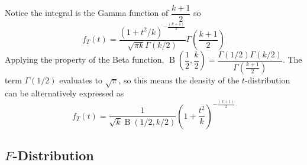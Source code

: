 \documentclass[11pt]{report} %
\begin{document}
Notice the integral is the Gamma function of $\dfrac{k+1}{2}$ so
\begin{equation}
f_{T}\left(t\right)=\dfrac{\left(1+t^{2}/k\right)^{-\frac{\left(k+1\right)}{2}}}{\sqrt{\pi k}\Gamma\left(k/2\right)}\Gamma\left(\dfrac{k+1}{2}\right)
\end{equation}
Applying the property of the Beta function, $\operatorname{B}\left(\dfrac{1}{2}, \dfrac{k}{2}\right) = \dfrac{\Gamma\left(1/2\right)\Gamma\left(k/2\right)}{\Gamma\left(\frac{k+1}{2}\right)}$. The term $\Gamma\left(1/2\right)$ evaluates to $\sqrt{\pi}$, so this means the density of the $t$-distribution can be alternatively expressed as
\begin{equation}
f_{T}\left(t\right)= \dfrac{1}{\sqrt{k}\operatorname{B}\left(1/2, k/2\right)}\left(1+\dfrac{t^{2}}{k}\right)^{-\frac{\left(k+1\right)}{2}}
\end{equation}

\subsection{$F$-Distribution}
\end{document}
